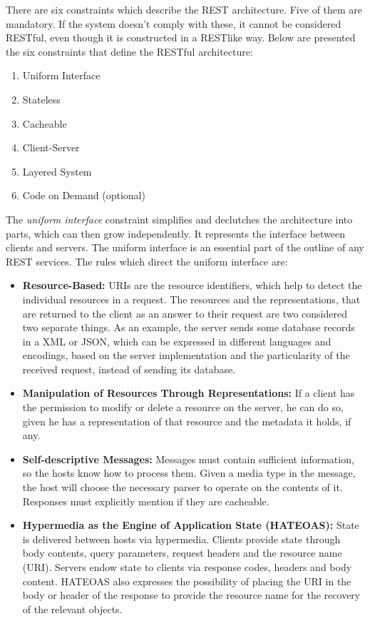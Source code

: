 There are six constraints which describe the REST architecture. Five of them are mandatory. If the system doesn't comply with these, it cannot be considered RESTful, even though it is constructed in a RESTlike way.
Below are presented the six constraints that define the RESTful architecture:
\begin{enumerate}
  \item Uniform Interface
  \item Stateless
  \item Cacheable
  \item Client-Server
  \item Layered System
  \item Code on Demand (optional)
\end{enumerate}
    
The \textit{uniform interface} constraint simplifies and declutches the architecture into parts, which can then grow independently. It represents the interface between clients and servers. The uniform interface is an essential part of the outline of any REST services.  The rules which direct the uniform interface are:

\begin{itemize}
  \item {\bf Resource-Based:} URIs are the resource identifiers, which help to detect the individual resources in a request. The resources and the representations, that are returned to the client as an answer to their request are two considered two separate things. As an example, the server sends some database records in a XML or JSON, which can be expressed in different languages and encodings, based on the server implementation and the particularity of the received request, instead of sending its database.

  \item {\bf Manipulation of Resources Through Representations:} If a client has the permission to modify or delete a resource on the server, he can do so, given he has a representation of that resource and the metadata it holds, if any.

  \item {\bf Self-descriptive Messages:} Messages must contain sufficient information, so the hosts know how to process them. Given a media type in the message, the host will choose the necessary parser to operate on the contents of it. Responses must explicitly mention if they are cacheable.

  \item {\bf Hypermedia as the Engine of Application State (HATEOAS):} State is delivered between hosts via hypermedia. Clients provide state through body contents, query parameters, request headers and the resource name (URI). Servers endow state to clients via response codes, headers and body content. HATEOAS also expresses the possibility of placing the URI in the body or header of the response to provide the resource name for the recovery of the relevant objects.
\end{itemize}

